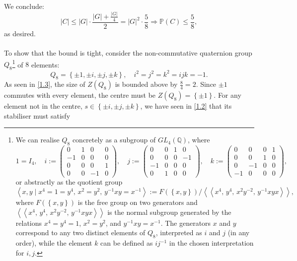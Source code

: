 \begin{solution}
    We conclude:
    \[
        |C| \leq |G|\cdot\frac{|G| + \frac{|G|}{4}}{2} = |G|^2 \cdot \frac{5}{8} \Rightarrow \mathbb{P}\left(C\right) \leq \frac{5}{8},
    \]
    as desired.
    \\\\
    To show that the bound is tight, consider the non-commutative quaternion group \( Q_8 \)\footnote{We can realise \( Q_8 \) concretely as a subgroup of \( GL_4\left( \mathbb{Q} \right) \), where
    \[
        1 = I_4, \quad
        i := \begin{pmatrix}
            0 & 1 & 0 & 0 \\
            -1 & 0 & 0 & 0 \\
            0 & 0 & 0 & 1 \\
            0 & 0 & -1 & 0
        \end{pmatrix}, \quad
        j := \begin{pmatrix}
            0 & 0 & 1 & 0 \\
            0 & 0 & 0 & -1 \\
            -1 & 0 & 0 & 0 \\
            0 & 1 & 0 & 0
        \end{pmatrix}, \quad
        k := \begin{pmatrix}
            0 & 0 & 0 & 1 \\
            0 & 0 & 1 & 0 \\
            0 & -1 & 0 & 0 \\
            -1 & 0 & 0 & 0
        \end{pmatrix},
    \]
    or abstractly as the quotient group
    \[
        \left\langle x, y \mid x^4 = 1 = y^4,\, x^2 = y^2,\, y^{-1} x y = x^{-1} \right\rangle := F\left( \left\{ x, y \right\} \right) / \left\langle\!\left\langle x^4,\, y^4,\, x^2 y^{-2},\, y^{-1} x y x \right\rangle\!\right\rangle,
    \]
    where \( F\left( \left\{ x, y \right\} \right) \) is the free group on two generators and \( \left\langle\!\left\langle x^4,\, y^4,\, x^2 y^{-2},\, y^{-1} x y x \right\rangle\!\right\rangle \) is the normal subgroup generated by the relations \( x^4 = y^4 = 1 \), \( x^2 = y^2 \), and \( y^{-1} x y = x^{-1} \). The generators \( x \) and \( y \) correspond to any two distinct elements of \( Q_8 \), interpreted as \( i \) and \( j \) (in any order), while the element \( k \) can be defined as \( i j^{-1} \) in the chosen interpretation for \( i, j \).} of \( 8 \) elements:
    \[
        Q_8 = \left\{ \pm 1, \pm i, \pm j, \pm k \right\}, \quad i^2 = j^2 = k^2 = ijk = -1.
    \]
    As seen in \eqref{1.3}, the size of \( Z\left( Q_8 \right) \) is bounded above by \( \frac{8}{4} = 2 \). Since \( \pm 1 \) commutes with every element, the centre must be \( Z\left( Q_8 \right) = \left\{ \pm 1 \right\} \). For any element not in the centre, \( s \in \left\{ \pm i, \pm j, \pm k \right\} \), we have seen in \eqref{1.2} that its stabiliser must satisfy

\end{solution}
